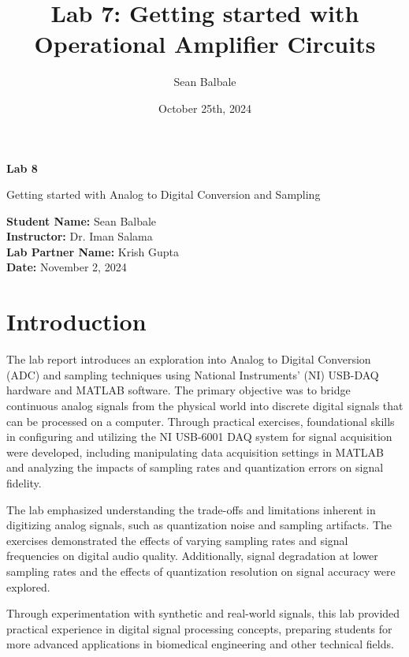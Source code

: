 \documentclass[12pt]{article}
\title{Lab 7: Getting started with Operational Amplifier Circuits}
\author{Sean Balbale}
\date{October 25th, 2024}
\begin{document}
\begin{titlepage}
	\begin{center}
		\vspace*{1in}

		\Huge
		\textbf{Lab 8}

		\LARGE
		Getting started with Analog to Digital Conversion and Sampling

		\vspace{3 in}

		\textbf{Student Name:} Sean Balbale
		\\ \textbf{Instructor:} Dr. Iman Salama
		\\ \textbf{Lab Partner Name:} Krish Gupta
		\\ \textbf{Date:} November 2, 2024

		\vfill


	\end{center}
\end{titlepage}

\newpage

\section{Introduction} 
The lab report introduces an exploration into Analog to Digital Conversion (ADC) 
and sampling techniques using National Instruments' (NI) USB-DAQ hardware and MATLAB 
software. The primary objective was to bridge continuous analog signals from the 
physical world into discrete digital signals that can be processed on a computer. 
Through practical exercises, foundational skills in configuring and utilizing the 
NI USB-6001 DAQ system for signal acquisition were developed, including manipulating 
data acquisition settings in MATLAB and analyzing the impacts of sampling rates and 
quantization errors on signal fidelity.
\newline

The lab emphasized understanding the trade-offs and limitations inherent in 
digitizing analog signals, such as quantization noise and sampling artifacts. The 
exercises demonstrated the effects of varying sampling rates and signal frequencies 
on digital audio quality. Additionally, signal 
degradation at lower sampling rates and the effects of quantization resolution on 
signal accuracy were explored.
\newline

Through experimentation with synthetic and real-world signals, this lab provided 
practical experience in digital signal processing concepts, preparing students for 
more advanced applications in biomedical engineering and other technical fields.
\newline
\end{document}

